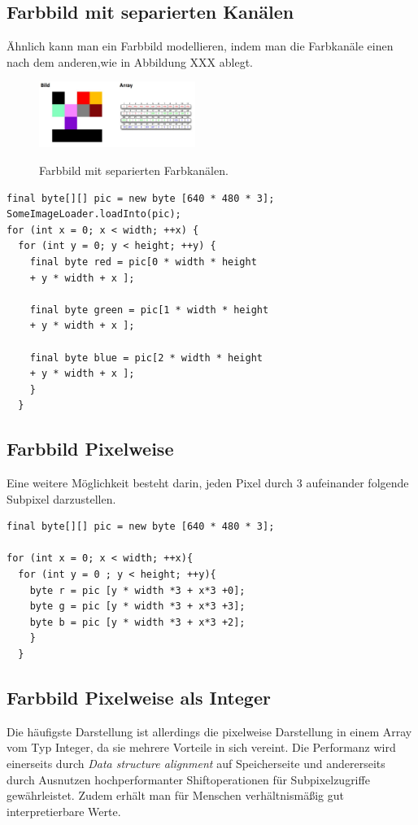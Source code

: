 \subsection{Farbbild mit separierten Kanälen}
Ähnlich kann man ein Farbbild modellieren, indem man die Farbkanäle einen nach dem anderen,wie in Abbildung XXX ablegt.

\begin{figure}[ht]
  \centering
  \includegraphics[width=2.0in]{images/BildKomponentenweise}
  \caption{Farbbild mit separierten Farbkanälen.}
  \label{fig:Separierte Farbkanaele}
  \cite{rehfeld}
\end{figure}

\begin{lstlisting}[caption=Farbbild mit separierten Kanälen]
final byte[][] pic = new byte [640 * 480 * 3];
SomeImageLoader.loadInto(pic);
for (int x = 0; x < width; ++x) {
  for (int y = 0; y < height; ++y) {
    final byte red = pic[0 * width * height
    + y * width + x ];
    
    final byte green = pic[1 * width * height 
    + y * width + x ];

    final byte blue = pic[2 * width * height
    + y * width + x ];
    }
  }
\end{lstlisting}

\subsection{Farbbild Pixelweise}
Eine weitere Möglichkeit besteht darin, jeden Pixel durch 3 aufeinander folgende Subpixel darzustellen.

\begin{lstlisting}[caption=Farbbild Pixelweise]
final byte[][] pic = new byte [640 * 480 * 3];

for (int x = 0; x < width; ++x){
  for (int y = 0 ; y < height; ++y){
    byte r = pic [y * width *3 + x*3 +0]; 
    byte g = pic [y * width *3 + x*3 +3];
    byte b = pic [y * width *3 + x*3 +2];
    }
  }
\end{lstlisting}

\subsection{Farbbild Pixelweise als Integer}
Die häufigste Darstellung ist allerdings die pixelweise Darstellung in einem Array vom Typ Integer, da sie mehrere Vorteile in sich vereint. Die Performanz wird einerseits durch \textit{Data structure alignment} auf Speicherseite und andererseits durch Ausnutzen hochperformanter Shiftoperationen für Subpixelzugriffe gewährleistet. Zudem erhält man für Menschen verhältnismäßig gut interpretierbare Werte. \cite{big-o}

